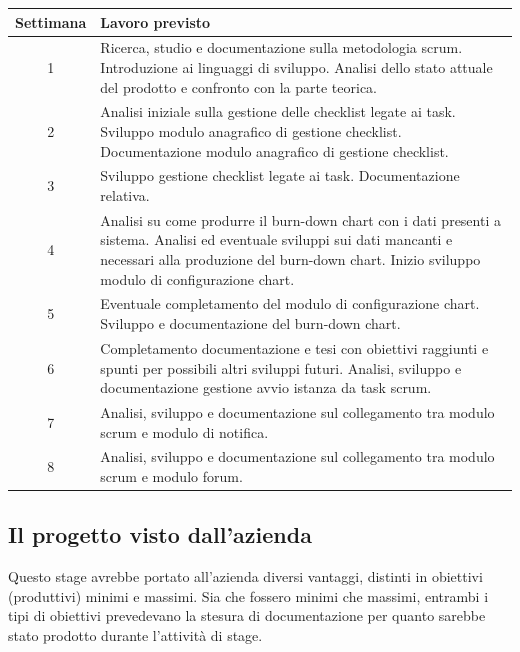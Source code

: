 \begin{tabular}{| c | p{10cm} |}

\hline
\textbf{Settimana} & \textbf{Lavoro previsto} \\
\hline
1 & Ricerca, studio e documentazione sulla metodologia scrum. Introduzione
    ai linguaggi di sviluppo. Analisi dello stato attuale del prodotto e
    confronto con la parte teorica. \\
\hline
2 & Analisi iniziale sulla gestione delle checklist legate ai task.
    Sviluppo modulo anagrafico di gestione checklist. Documentazione modulo
    anagrafico di gestione checklist. \\
\hline
3 & Sviluppo gestione checklist legate ai task. Documentazione relativa. \\
\hline
4 & Analisi su come produrre il burn-down chart con i dati presenti a
    sistema. Analisi ed eventuale sviluppi sui dati mancanti e necessari
    alla produzione del burn-down chart. Inizio sviluppo modulo di
    configurazione chart. \\
\hline
5 & Eventuale completamento del modulo di configurazione chart. Sviluppo e
    documentazione del burn-down chart. \\
\hline
6 & Completamento documentazione e tesi con obiettivi raggiunti e spunti
    per possibili altri sviluppi futuri. Analisi, sviluppo e
    documentazione gestione avvio istanza da task scrum. \\
\hline
7 & Analisi, sviluppo e documentazione sul collegamento tra modulo scrum e
    modulo di notifica. \\
\hline
8 & Analisi, sviluppo e documentazione sul collegamento tra modulo scrum e
    modulo forum. \\
\hline
\end{tabular}
\label{tab:piano-di-lavoro}

\subsection{Il progetto visto dall'azienda}\label{sec:strat-ob-prod}

Questo stage avrebbe portato all'azienda diversi vantaggi, distinti in
obiettivi (produttivi) minimi e massimi. Sia che fossero minimi che massimi,
entrambi i tipi di obiettivi prevedevano la stesura di documentazione per
quanto sarebbe stato prodotto durante l'attività di stage. \\

